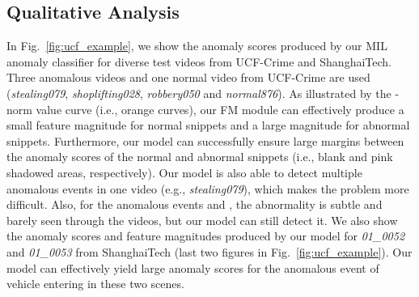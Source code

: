\documentclass[final]{cvpr}
\begin{document}
\begin{table}[htbp]
\centering
{}
\caption{Ablation studies of our method on ShanghaiTech and UCF-Crime.}
\label{tab:ablation}
\end{table}











\subsection{Qualitative Analysis}

In Fig.~\ref{fig:ucf_example}, we show the anomaly scores produced by our MIL anomaly classifier for diverse test videos from UCF-Crime and ShanghaiTech. Three anomalous videos and one normal video from UCF-Crime are used (\textit{stealing079}, \textit{shoplifting028}, \textit{robbery050} and \textit{normal876}). 
As illustrated by the -norm value curve (i.e., orange curves), our FM module can effectively produce a small feature magnitude for normal snippets and a large magnitude for abnormal snippets. Furthermore, our model can successfully ensure large margins between the anomaly scores of the normal and abnormal snippets (i.e., blank and pink shadowed areas, respectively). Our model is also able to detect multiple anomalous events in one video (e.g., \textit{stealing079}), which makes the problem more difficult. Also, for the anomalous events   and , the abnormality is subtle and barely seen through the videos, but our model can still detect it. 
We also show the anomaly scores and feature magnitudes produced by our model for \textit{01\_0052} and \textit{01\_0053} from ShanghaiTech (last two figures in Fig.~\ref{fig:ucf_example}). Our model can effectively yield large anomaly scores for the anomalous event of vehicle entering in these two scenes.  
\end{document}
